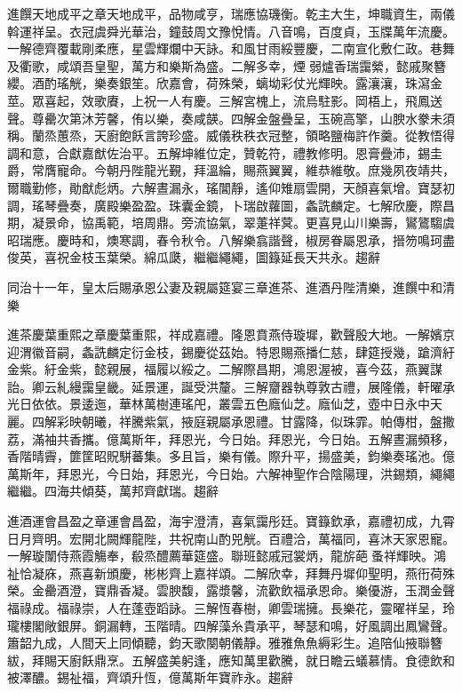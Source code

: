 \begin{pinyinscope}
進饌天地成平之章天地成平，品物咸亨，瑞應協璣衡。乾主大生，坤職資生，兩儀斡運祥呈。衣冠虞舜光華治，鐘鼓周文豫悅情。八音鳴，百度貞，玉牒萬年流慶。一解德齊覆載剛柔應，星雲輝爛中天詠。和風甘雨綏豐慶，二南宣化敷仁政。巷舞及衢歌，咸頌吾皇聖，萬方和樂斯為盛。二解多幸，煙弱爐香瑞靄縈，懿戚聚簪纓。酒酌瑤觥，樂奏銀笙。欣嘉會，荷殊榮，螭坳彩仗光輝映。露瀼瀼，珠瀉金莖。眾喜起，效歌賡，上祝一人有慶。三解宮槐上，流烏駐影。岡梧上，飛鳳送聲。尊罍次第沐芳馨，侑以樂，奏咸韺。四解金盤疊呈，玉碗高擎，山腴水豢未須稱。蘭烝蕙烝，天廚飽飫言誇珍盛。威儀秩秩衣冠整，領略鹽梅許作羹。從教悟得調和意，合獻嘉猷佐治平。五解坤維位定，贊乾符，禮教修明。恩膏疊沛，錫圭爵，常膺寵命。今朝丹陛龍光覲，拜溫綸，賜燕翼翼，維恭維敬。庶幾夙夜靖共，爾職勤修，勛猷彪炳。六解晝漏永，瑤閶靜，遙仰雉扇雲開，天顏喜氣增。寶瑟初調，瑤琴疊奏，廣殿樂盈盈。珠囊金鏡，卜瑞啟蘿圖，螽詵麟定。七解欣慶，際昌期，凝景命，協禹範，培周鼎。旁流協氣，翠萐祥蓂。更喜見山川樂壽，鸑鷟騶虞昭瑞應。慶時和，燠寒調，春令秋令。八解樂翕諧聲，椒房眷屬恩承，搢笏鳴珂盡俊英，喜祝金枝玉葉榮。綿瓜瓞，繼繼繩繩，圖籙延長天共永。趨辭

同治十一年，皇太后賜承恩公妻及親屬筵宴三章進茶、進酒丹陛清樂，進饌中和清樂

進茶慶葉重熙之章慶葉重熙，祥成嘉禮。隆恩賁燕侍璇墀，歡聲殷大地。一解嬪京迎渭徽音嗣，螽詵麟定衍金枝，錫慶從茲始。特恩賜燕播仁慈，肆筵授幾，蹌濟紆金紫。紆金紫，懿親展，福履以綏之。二解際昌期，鴻恩渥被，喜今茲，燕翼謀詒。卿云糺縵靄皇畿。延景運，誕受洪釐。三解齏器執尊敦古禮，展隆儀，軒曜承光日依依。景逶迤，華林萬樹連瑤戺，叢雲五色廕仙芝。廕仙芝，壺中日永中天麗。四解彩映朝曦，祥騰紫氣，掖庭親屬承恩禮。甘露降，似珠霏。帕傳柑，盤撒荔，滿袖共香攜。億萬斯年，拜恩光，今日始。拜恩光，今日始。五解晝漏頻移，香階晴霽，篚筐昭貺駢蕃集。多且旨，樂有儀。際升平，揚盛美，鈞樂奏瑤池。億萬斯年，拜恩光，今日始，拜恩光，今日始。六解神聖作合陰陽理，洪錫類，繩繩繼繼。四海共傾葵，萬邦齊獻瑞。趨辭

進酒運會昌盈之章運會昌盈，海宇澄清，喜氣靄彤廷。寶籙欽承，嘉禮初成，九霄日月齊明。宏開北闕輝龍陛，共祝南山酌兕觥。百禮洽，萬福同，喜沐天家恩寵。一解璇闈侍燕霞觴奉，殽烝醴薦華筵盛。聯班懿戚冠裳炳，龍旂葩蚤祥輝映。鴻祉恰凝庥，燕喜新頒慶，彬彬齊上嘉祥頌。二解欣幸，拜舞丹墀仰聖明，燕衎荷殊榮。金罍酒澄，寶鼎香凝。雲腴馥，露漿馨，流歡飲福承恩命。樂優游，玉潤金聲福祿成。福祿崇，人在蓬壺蹈詠。三解恆春樹，卿雲瑞擁。長樂花，靈曜祥呈，玲瓏樓閣敞銀屏。銅漏轉，玉階晴。四解藻糸貴承平，琴瑟和鳴，好風調出鳳鸞聲。簫韶九成，人間天上同傾聽，鈞天歌闋朝儀靜。雅雅魚魚縟彩生。追陪仙掖聯簪紱，拜賜天廚飫鼎烹。五解盛美躬逢，應知萬里歡騰，就日瞻云蟻慕情。食德飲和被澤醲。錫祉福，齊頌升恆，億萬斯年寶祚永。趨辭


\end{pinyinscope}
